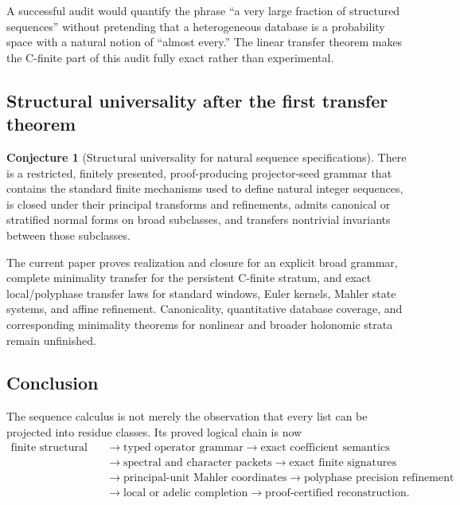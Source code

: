 \documentclass[11pt]{article}
\theoremstyle{definition}\newtheorem{definition}[theorem]{Definition}\newtheorem{example}[theorem]{Example}\newtheorem{construction}[theorem]{Construction}\newtheorem{algorithm}[theorem]{Algorithm}\newtheorem{conjecture}[theorem]{Conjecture}\newtheorem{problem}[theorem]{Problem}
\theoremstyle{remark}\newtheorem{remark}[theorem]{Remark}\newtheorem{boundary}[theorem]{Boundary}\newtheorem{certificate}[theorem]{Computational Certificate}\newtheorem{classical}[theorem]{Classical Input}\newtheorem{principle}[theorem]{Structural Principle}
\begin{document}
A successful audit would quantify the phrase ``a very large fraction of structured sequences'' without pretending that a heterogeneous database is a probability space with a natural notion of ``almost every.''  The linear transfer theorem makes the C-finite part of this audit fully exact rather than experimental.

\subsection{Structural universality after the first transfer theorem}
\begin{conjecture}[Structural universality for natural sequence specifications]
There is a restricted, finitely presented, proof-producing projector-seed grammar that contains the standard finite mechanisms used to define natural integer sequences, is closed under their principal transforms and refinements, admits canonical or stratified normal forms on broad subclasses, and transfers nontrivial invariants between those subclasses.
\end{conjecture}

The current paper proves realization and closure for an explicit broad grammar, complete minimality transfer for the persistent C-finite stratum, and exact local/polyphase transfer laws for standard windows, Euler kernels, Mahler state systems, and affine refinement. Canonicality, quantitative database coverage, and corresponding minimality theorems for nonlinear and broader holonomic strata remain unfinished.

\subsection{Conclusion}
The sequence calculus is not merely the observation that every list can be projected into residue classes.  Its proved logical chain is now
\[
\boxed{
\begin{aligned}
\text{finite structural seed}
&\longrightarrow\text{typed operator grammar}
\longrightarrow\text{exact coefficient semantics}\\
&\longrightarrow\text{spectral and character packets}
\longrightarrow\text{exact finite signatures}\\
&\longrightarrow\text{principal-unit Mahler coordinates}
\longrightarrow\text{polyphase precision refinement}\\
&\longrightarrow\text{local or adelic completion}
\longrightarrow\text{proof-certified reconstruction}.
\end{aligned}}
\]
\end{document}
